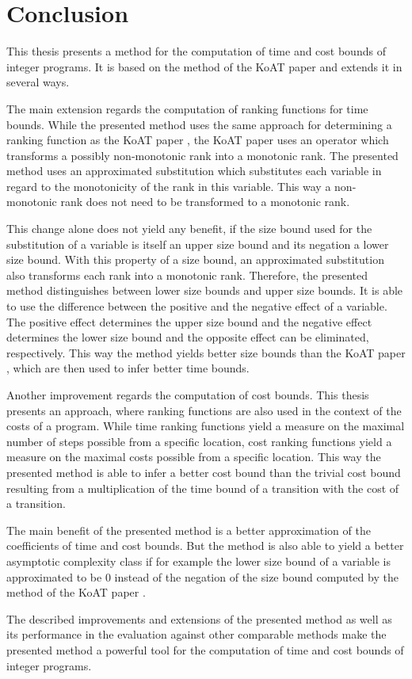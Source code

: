 \section{Conclusion}

This thesis presents a method for the computation of time and cost bounds of integer programs.
It is based on the method of the KoAT paper \cite{koat} and extends it in several ways.

The main extension regards the computation of ranking functions for time bounds.
While the presented method uses the same approach for determining a ranking function as the KoAT paper \cite{koat}, the KoAT paper uses an operator which transforms a possibly non-monotonic rank into a monotonic rank.
The presented method uses an approximated substitution which substitutes each variable in regard to the monotonicity of the rank in this variable.
This way a non-monotonic rank does not need to be transformed to a monotonic rank.

This change alone does not yield any benefit, if the size bound used for the substitution of a variable is itself an upper size bound and its negation a lower size bound.
With this property of a size bound, an approximated substitution also transforms each rank into a monotonic rank.
Therefore, the presented method distinguishes between lower size bounds and upper size bounds.
It is able to use the difference between the positive and the negative effect of a variable.
The positive effect determines the upper size bound and the negative effect determines the lower size bound and the opposite effect can be eliminated, respectively.
This way the method yields better size bounds than the KoAT paper \cite{koat}, which are then used to infer better time bounds.

Another improvement regards the computation of cost bounds.
This thesis presents an approach, where ranking functions are also used in the context of the costs of a program.
While time ranking functions yield a measure on the maximal number of steps possible from a specific location, cost ranking functions yield a measure on the maximal costs possible from a specific location.
This way the presented method is able to infer a better cost bound than the trivial cost bound resulting from a multiplication of the time bound of a transition with the cost of a transition.

The main benefit of the presented method is a better approximation of the coefficients of time and cost bounds.
But the method is also able to yield a better asymptotic complexity class if for example the lower size bound of a variable is approximated to be $0$ instead of the negation of the size bound computed by the method of the KoAT paper \cite{koat}.

The described improvements and extensions of the presented method as well as its performance in the evaluation against other comparable methods make the presented method a powerful tool for the computation of time and cost bounds of integer programs.
